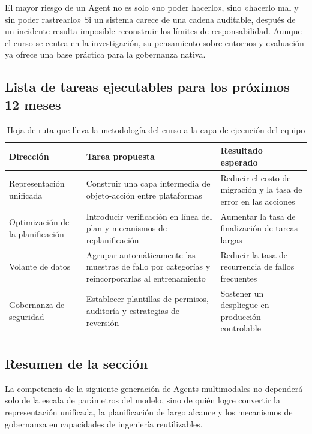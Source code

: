 \documentclass[a4paper]{article}
\begin{document}
\begin{warningbox}{El mayor riesgo de un Agent no es solo «no poder hacerlo», sino «hacerlo mal y sin poder rastrearlo»}
Si un sistema carece de una cadena auditable, después de un incidente resulta imposible reconstruir los límites de responsabilidad. Aunque el curso se centra en la investigación, su pensamiento sobre entornos y evaluación ya ofrece una base práctica para la gobernanza nativa.
\end{warningbox}

\subsection{Lista de tareas ejecutables para los próximos 12 meses}
\begin{table}[H]
\centering
\begin{tabular}{p{2.8cm}p{4.8cm}p{3.6cm}}
\toprule
\textbf{Dirección} & \textbf{Tarea propuesta} & \textbf{Resultado esperado} \\
\midrule
Representación unificada & Construir una capa intermedia de objeto-acción entre plataformas & Reducir el costo de migración y la tasa de error en las acciones \\
Optimización de la planificación & Introducir verificación en línea del plan y mecanismos de replanificación & Aumentar la tasa de finalización de tareas largas \\
Volante de datos & Agrupar automáticamente las muestras de fallo por categorías y reincorporarlas al entrenamiento & Reducir la tasa de recurrencia de fallos frecuentes \\
Gobernanza de seguridad & Establecer plantillas de permisos, auditoría y estrategias de reversión & Sostener un despliegue en producción controlable \\
\bottomrule
\end{tabular}
\caption{Hoja de ruta que lleva la metodología del curso a la capa de ejecución del equipo}
\end{table}

\subsection{Resumen de la sección}
La competencia de la siguiente generación de Agents multimodales no dependerá solo de la escala de parámetros del modelo, sino de quién logre convertir la representación unificada, la planificación de largo alcance y los mecanismos de gobernanza en capacidades de ingeniería reutilizables.
\end{document}
